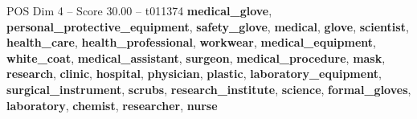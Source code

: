 \begin{textsample}{POS Dim 4 – Score 30.00 – t011374}  \label{ex:f4_pos_012}
\textbf{medical\_glove}, \textbf{personal\_protective\_equipment}, \textbf{safety\_glove}, \textbf{medical}, \textbf{glove}, \textbf{scientist}, \textbf{health\_care}, \textbf{health\_professional}, \textbf{workwear}, \textbf{medical\_equipment}, \textbf{white\_coat}, \textbf{medical\_assistant}, \textbf{surgeon}, \textbf{medical\_procedure}, \textbf{mask}, \textbf{research}, \textbf{clinic}, \textbf{hospital}, \textbf{physician}, \textbf{plastic}, \textbf{laboratory\_equipment}, \textbf{surgical\_instrument}, \textbf{scrubs}, \textbf{research\_institute}, \textbf{science}, \textbf{formal\_gloves}, \textbf{laboratory}, \textbf{chemist}, \textbf{researcher}, \textbf{nurse}

\end{textsample}
